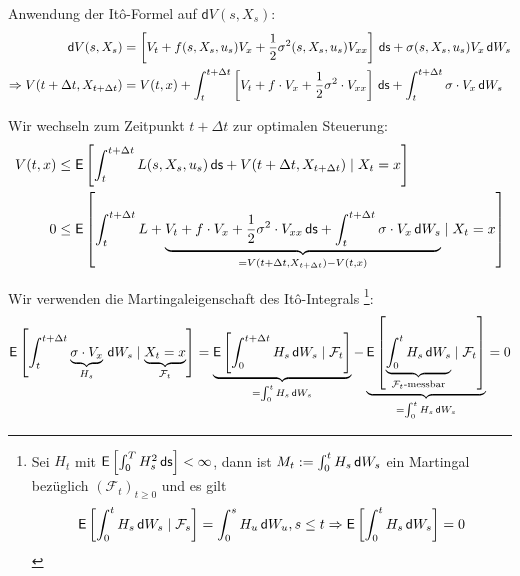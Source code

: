 \documentclass[a4paper, 12pt]{scrartcl}
\newcommand{\ds}{\thinspace \mathsf{ds}}
\newcommand{\dW}{\thinspace \mathsf{d}W}
\begin{document}
\begin{beweis}
    Anwendung der Itô-Formel
    \footnotemark[1]
    auf $\mathsf{d}V(s,X_s)$:
    \begin{align*}
        \mathsf{d}V(s,X_s) 
        &= 
        \left[
            V_t + f(s,X_s,u_s) V_x + \frac{1}{2} \sigma^2(s,X_s,u_s) V_{xx}
        \right]
        \ds 
        + \sigma(s,X_s,u_s) V_x \dW_s
        \\
        \Rightarrow
        V(t + \Delta t, X_{t + \Delta t})
        &= V(t,x) 
        + \int_{t}^{t+\Delta t}
        \left[
            V_t + f \cdot V_x + \frac{1}{2} \sigma^2 \cdot V_{xx}
        \right]
        \ds 
        + \int_{t}^{t+\Delta t} \sigma \cdot V_x \dW_s
    \end{align*}

    Wir wechseln zum Zeitpunkt $t+\Delta t$ zur optimalen Steuerung:
    \begin{align*}
        V(t,x) &\leq 
        \mathsf{E}
        \left[
            \int_{t}^{t+\Delta t} L(s,X_s,u_s) \ds 
            + V(t + \Delta t, X_{t + \Delta t}) \mid X_t = x
        \right]
        \\
        0 &\leq 
        \mathsf{E}
        \left[
            \int_{t}^{t+\Delta t}
            L 
            + 
            \underbrace{
                V_t + f \cdot V_x + \frac{1}{2} \sigma^2 \cdot V_{xx} \ds
                + \int_{t}^{t+\Delta t} \sigma \cdot V_x \dW_s
            }_{
                = V(t + \Delta t, X_{t + \Delta t}) - V(t,x)
            }
        \mid X_t = x
        \right]
    \end{align*}

    Wir verwenden die Martingaleigenschaft des 
    Itô-Integrals
    \footnote{
        Sei $H_t$ mit $\mathsf{E}\left[ \int_0^T H_s^2 \ds \right] < \infty$, dann ist 
        $M_t := \int_0^t H_s \dW_s$ ein Martingal bezüglich 
        $(\mathcal{F}_t)_{t \geq 0}$ und es gilt
        \begin{align*}
            \mathsf{E}\left[ \int_0^t H_s \dW_s \mid \mathcal{F}_s \right] 
            = \int_0^s H_u \dW_u,  s \leq t
            \Rightarrow
            \mathsf{E}\left[ \int_0^t H_s \dW_s \right] = 0
        \end{align*}
    }:
    \begin{align*}
        \mathsf{E}
        \left[
            \int_{t}^{t+\Delta t} \underbrace{\sigma \cdot V_x}_{H_s} \dW_s 
            \mid \underbrace{X_t = x}_{\mathcal{F}_t}
        \right]
        =
        \underbrace{
            \mathsf{E}
            \left[
                \int_{0}^{t+\Delta t} H_s \dW_s 
                \mid \mathcal{F}_t
            \right]
        }_{
            = \int_0^t H_s \dW_s
        }
        -
        \underbrace{
            \mathsf{E}
            \left[
                \underbrace{\int_{0}^{t} H_s \dW_s }_{\mathcal{F}_t \text{-messbar}}
                \mid \mathcal{F}_t
            \right]
        }_{= \int_0^t H_s \dW_s}
        = 0
    \end{align*}
    

\end{beweis}
\end{document}
